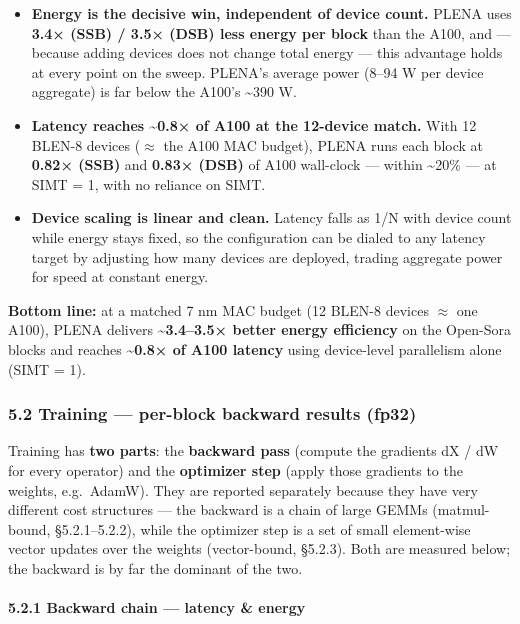 \documentclass[
  10pt,
]{article}
\providecommand{\tightlist}{%
  \setlength{\itemsep}{0pt}\setlength{\parskip}{0pt}}
\begin{document}
\begin{itemize}
\tightlist
\item
  \textbf{Energy is the decisive win, independent of device count.}
  PLENA uses \textbf{3.4× (SSB) / 3.5× (DSB) less energy per block} than
  the A100, and --- because adding devices does not change total energy
  --- this advantage holds at every point on the sweep. PLENA's average
  power (8--94 W per device aggregate) is far below the A100's
  \textasciitilde390 W.
\item
  \textbf{Latency reaches \textasciitilde0.8× of A100 at the 12-device
  match.} With 12 BLEN-8 devices (\(\approx\) the A100 MAC budget), PLENA runs
  each block at \textbf{0.82× (SSB)} and \textbf{0.83× (DSB)} of A100
  wall-clock --- within \textasciitilde20\% --- at SIMT = 1, with no
  reliance on SIMT.
\item
  \textbf{Device scaling is linear and clean.} Latency falls as 1/N with
  device count while energy stays fixed, so the configuration can be
  dialed to any latency target by adjusting how many devices are
  deployed, trading aggregate power for speed at constant energy.
\end{itemize}

\textbf{Bottom line:} at a matched 7 nm MAC budget (12 BLEN-8 devices \(\approx\)
one A100), PLENA delivers \textbf{\textasciitilde3.4--3.5× better energy
efficiency} on the Open-Sora blocks and reaches
\textbf{\textasciitilde0.8× of A100 latency} using device-level
parallelism alone (SIMT = 1).

\subsubsection{5.2 Training --- per-block backward results (fp32)}\label{training-backward-results}

Training has \textbf{two parts}: the \textbf{backward pass} (compute the
gradients dX / dW for every operator) and the \textbf{optimizer step}
(apply those gradients to the weights, e.g.~AdamW). They are reported
separately because they have very different cost structures --- the
backward is a chain of large GEMMs (matmul-bound, §5.2.1--5.2.2), while
the optimizer step is a set of small element-wise vector updates over the
weights (vector-bound, §5.2.3). Both are measured below; the backward is
by far the dominant of the two.

\paragraph{5.2.1 Backward chain --- latency \& energy}\label{bwd-chain-results}
\end{document}
